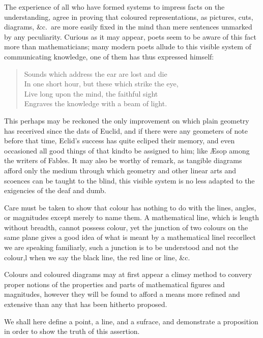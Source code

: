     The experience of all who have formed systems to impress facts on the 
    understanding, agree in proving that coloured representations, as 
    pictures, cuts, diagrams, \&c.~are more easily fixed in the mind than 
    mere sentences unmarked by any peculiarity. Curious as it may appear, 
    poets seem to be aware of this fact more than mathematicians; many modern 
    poets allude to this visible system of communicating knowledge, one of 
    them has thus expressed himself: 
    \begin{quotation}
        Sounds which address the ear are lost and die\\
        In one short hour, but these which strike the eye,\\
        Live long upon the mind, the faithful sight\\
        Engraves the knowledge with a beam of light.
    \end{quotation}
    This perhaps may be reckoned the only improvement on which plain 
    geometry has recerived since the dats of Euclid, and if there were any 
    geometers of note before that time, Eclid's success has quite ecliped 
    their memory, and even occasioned all good things of that kindto be 
    assigned to him; like \AE sop among the writers of Fables. It may also be 
    worthy of remark, as tangible diagrams afford only the medium through 
    which geometry and other linear arts and scoences can be taught to the 
    blind, this visible system is no less adapted to the exigencies of the 
    deaf and dumb. 

    Care must be taken to show that colour has nothing to do with the lines, angles, or magnitudes except merely to name them. A mathematical line, which is length without breadth, cannot possess colour, yet the junction of two colours on the same plane gives a good idea of what is meant by a mathematical linel recorllect we are speaking familiarly, such a junction is to be understood and not the colour,l when we say the black line, the red line or line, \&c. 

    Colours and coloured diagrams may at first appear a climsy method to convery proper notions of the properties and parts of mathematical figures and magnitudes, however they will be found to afford a means more refined and extensive than any that has been hitherto proposed. 

    We shall here define a point, a line, and a sufrace, and demonstrate a proposition in order to show the truth of this assertion. 

